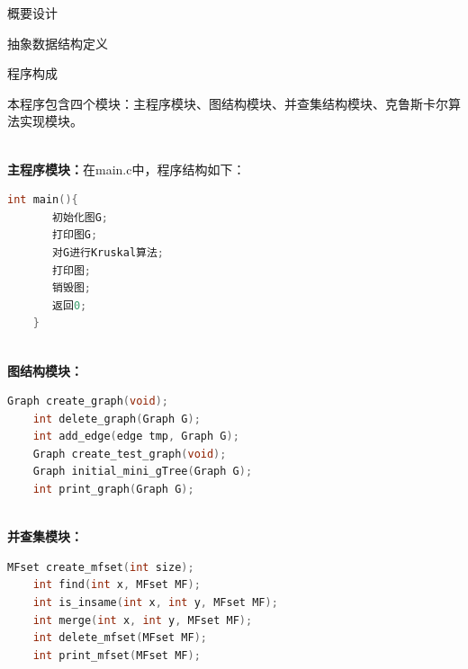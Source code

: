 \documentclass[UTF8]{ctexart}
\begin{document}
\begin{section}{概要设计}
\begin{subsection}{抽象数据结构定义}
\end{subsection}


\begin{subsection}{程序构成}

本程序包含四个模块：主程序模块、图结构模块、并查集结构模块、克鲁斯卡尔算法实现模块。

\textbf{\\主程序模块：}在main.c中，程序结构如下：

\begin{mdframed}[everyline=true]
\begin{lstlisting}[language=c]
	int main(){
	   初始化图G;
	   打印图G;
	   对G进行Kruskal算法;
	   打印图;
	   销毁图;
	   返回0;
	}
\end{lstlisting}
\end{mdframed}


\textbf{\\图结构模块：\\}

\begin{mdframed}[everyline=true]
\begin{lstlisting}[language=c]
    Graph create_graph(void);
    int delete_graph(Graph G);
    int add_edge(edge tmp, Graph G);
    Graph create_test_graph(void);
    Graph initial_mini_gTree(Graph G);
    int print_graph(Graph G);
\end{lstlisting}
\end{mdframed}




\textbf{\\并查集模块：\\}

\begin{mdframed}[everyline=true]
\begin{lstlisting}[language=c]
    MFset create_mfset(int size);
    int find(int x, MFset MF);
    int is_insame(int x, int y, MFset MF);
    int merge(int x, int y, MFset MF);
    int delete_mfset(MFset MF);
    int print_mfset(MFset MF);
\end{lstlisting}
\end{mdframed}



\end{subsection}
\end{section}
\end{document}
